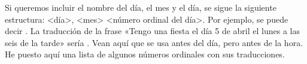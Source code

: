 Si queremos incluir el nombre del d\'ia, el mes y el d\'ia, se sigue la siguiente estructura:
<día>, <mes> <número ordinal del d\'ia>.
Por ejemplo, se puede decir .
La traducci\'on de la frase «Tengo una fiesta el d\'ia 5 de abril el lunes a las seis de la tarde» ser\'ia
.
Vean aqu\'i que se usa  antes del d\'ia, pero  antes de la hora. \\

He puesto aqu\'i una lista de algunos n\'umeros ordinales con sus traducciones.
